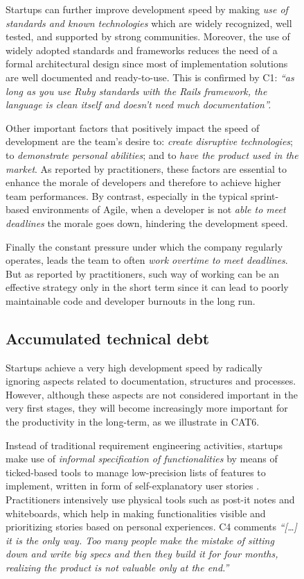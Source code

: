 \documentclass[12pt,journal,compsoc]{../sty/IEEEtran}
\begin{document}
\begin{table}[!t]
\begin{figure}[!t]
\begin{compactitem}
Startups can further improve development speed by making \textit{use of
standards and known technologies} which are widely recognized, well tested, and
supported by strong communities. Moreover, the use of widely adopted standards
and frameworks reduces the need of a formal architectural design since most of
implementation solutions are well documented and ready-to-use. This is confirmed
by C1: \textit{``as long as you use Ruby standards with the Rails framework, the
language is clean itself and doesn't need much documentation''.}

Other important factors that positively impact the speed of development are the
team's desire to: \textit{create disruptive technologies}; to
\textit{demonstrate personal abilities}; and to \textit{have the product used in
the market}. As reported by practitioners, these factors are essential to
enhance the morale of developers and therefore to achieve higher team
performances. By contrast, especially in the typical sprint-based environments
of Agile, when a developer is not \textit{able to meet deadlines} the morale
goes down, hindering the development speed.

Finally the constant pressure under which the company regularly operates, leads
the team to often \textit{work overtime to meet deadlines}. But as reported by
practitioners, such way of working can be an effective strategy only in the
short term since it can lead to poorly maintainable code and developer burnouts
in the long run.
\subsection{Accumulated technical debt} \label{res:gsm:cat5} Startups achieve a
very high development speed by radically ignoring aspects  related to
documentation, structures and processes. However, although these  aspects are
not considered important in the very first stages, they will become
increasingly more important for the productivity in the long-term, as we
illustrate in CAT6.


Instead of traditional requirement engineering activities, startups make use of
\textit{informal specification of functionalities} by means of ticked-based
tools to manage low-precision lists of features to implement, written in form of
self-explanatory user stories \cite{AgilePlan}. Practitioners intensively use
physical tools such as post-it notes and whiteboards, which help in making
functionalities visible and prioritizing stories based on personal experiences.
C4 comments \textit{``[\ldots] it is the only way. Too many people make the
mistake of sitting down and write big specs and then they build it for four
months, realizing the product is not valuable only at the end.''}


\end{compactitem}
\end{figure}
\end{table}
\end{document}

